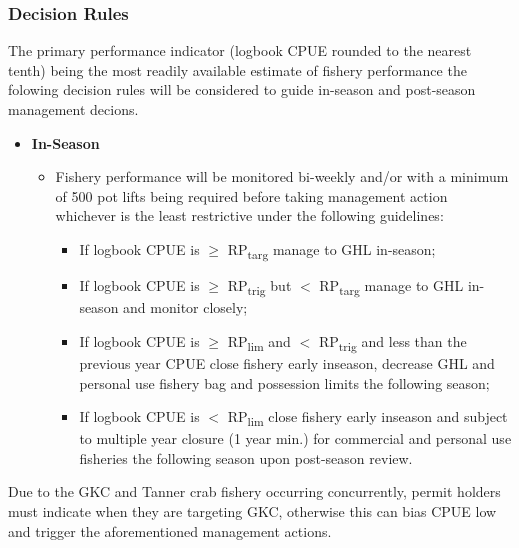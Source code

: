 \documentclass[]{article}
\providecommand{\tightlist}{%
  \setlength{\itemsep}{0pt}\setlength{\parskip}{0pt}}
\begin{document}
\subsubsection*{Decision Rules}\label{decision-rules}

The primary performance indicator (logbook CPUE rounded to the nearest
tenth) being the most readily available estimate of fishery performance
the folowing decision rules will be considered to guide in-season and
post-season management decions.

\begin{itemize}
\tightlist
\item
  \textbf{In-Season}

  \begin{itemize}
  \tightlist
  \item
    Fishery performance will be monitored bi-weekly and/or with a
    minimum of 500 pot lifts being required before taking management
    action whichever is the least restrictive under the following
    guidelines:

    \begin{itemize}
    \tightlist
    \item
      If logbook CPUE is \(\geq\) RP\textsubscript{targ} manage to GHL
      in-season;
    \item
      If logbook CPUE is \(\geq\) RP\textsubscript{trig} but \(<\)
      RP\textsubscript{targ} manage to GHL in-season and monitor
      closely;
    \item
      If logbook CPUE is \(\geq\) RP\textsubscript{lim} and \(<\)
      RP\textsubscript{trig} and less than the previous year CPUE close
      fishery early inseason, decrease GHL and personal use fishery bag
      and possession limits the following season;
    \item
      If logbook CPUE is \(<\) RP\textsubscript{lim} close fishery early
      inseason and subject to multiple year closure (1 year min.) for
      commercial and personal use fisheries the following season upon
      post-season review.
    \end{itemize}
  \end{itemize}
\end{itemize}

Due to the GKC and Tanner crab fishery occurring concurrently, permit
holders must indicate when they are targeting GKC, otherwise this can
bias CPUE low and trigger the aforementioned management actions.
\end{document}
